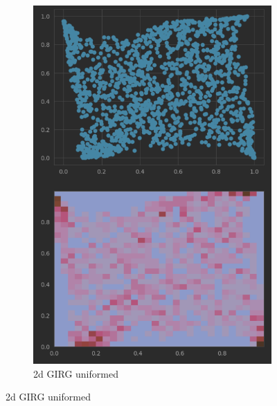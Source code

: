 \begin{figure}
\begin{subfigure}{0.49\textwidth}
      \includegraphics[width=\linewidth]{figures/diffmap_plot_uniformed.png}
      \caption{2d GIRG uniformed}
      \label{fig:sub2}
    \end{subfigure}
  
    \vspace{1em}
  

\end{figure}
